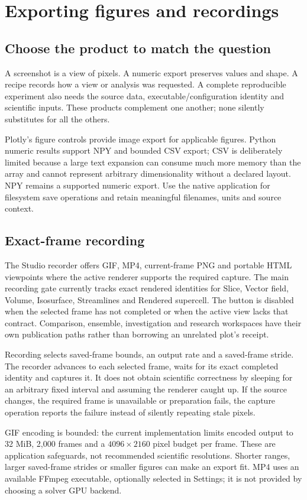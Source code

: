 \section{Exporting figures and recordings}
\subsection{Choose the product to match the question}
A screenshot is a view of pixels. A numeric export preserves values and shape.
A recipe records how a view or analysis was requested. A complete reproducible
experiment also needs the source data, executable/configuration identity and
scientific inputs. These products complement one another; none silently
substitutes for all the others.

Plotly's figure controls provide image export for applicable figures. Python
numeric results support NPY and bounded CSV export; CSV is deliberately limited
because a large text expansion can consume much more memory than the array and
cannot represent arbitrary dimensionality without a declared layout. NPY
remains a supported numeric export. Use the native application for filesystem
save operations and retain meaningful filenames, units and source context.

\subsection{Exact-frame recording}
The Studio recorder offers GIF, MP4, current-frame PNG and portable HTML
viewpoints where the active renderer supports the required capture. The main
recording gate currently tracks exact rendered identities for Slice, Vector
field, Volume, Isosurface, Streamlines and Rendered supercell. The button is
disabled when the selected frame has not completed or when the active view lacks
that contract. Comparison, ensemble, investigation and research workspaces have
their own publication paths rather than borrowing an unrelated plot's receipt.

Recording selects saved-frame bounds, an output rate and a saved-frame stride.
The recorder advances to each selected frame, waits for its exact completed
identity and captures it. It does not obtain scientific correctness by sleeping
for an arbitrary fixed interval and assuming the renderer caught up. If the
source changes, the required frame is unavailable or preparation fails, the
capture operation reports the failure instead of silently repeating stale pixels.

GIF encoding is bounded: the current implementation limits encoded output to
32 MiB, 2,000 frames and a $4096\times2160$ pixel budget per frame. These are
application safeguards, not recommended scientific resolutions. Shorter ranges,
larger saved-frame strides or smaller figures can make an export fit. MP4 uses
an available FFmpeg executable, optionally selected in Settings; it is not
provided by choosing a solver GPU backend.

